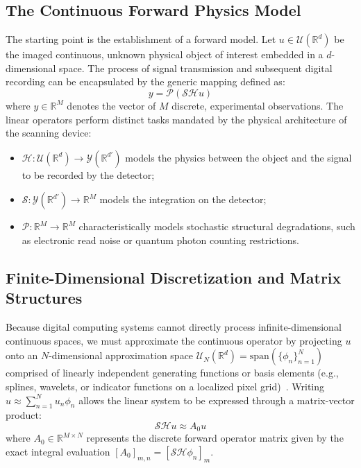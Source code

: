 \subsection{The Continuous Forward Physics Model}
The starting point is the establishment of a forward model. Let $u \in \mathcal{U}(\mathbb{R}^d)$ be the imaged continuous, unknown physical object of interest embedded in a $d$-dimensional space. The process of signal transmission and subsequent digital recording can be encapsulated by the generic mapping defined as:
\begin{equation}
    y = \mathcal{P}(\mathcal{S}\mathcal{H}u)
\end{equation}
where $y \in \mathbb{R}^M$ denotes the vector of $M$ discrete, experimental observations. The linear operators perform distinct tasks mandated by the physical architecture of the scanning device:
\begin{itemize}
    \item $\mathcal{H}: \mathcal{U}(\mathbb{R}^d) \to \mathcal{Y}(\mathbb{R}^{d'})$ models the physics between the object and the signal to be recorded by the detector;
    \item $\mathcal{S}: \mathcal{Y}(\mathbb{R}^{d'}) \to \mathbb{R}^M$ models the integration on the detector; 
    \item $\mathcal{P}: \mathbb{R}^M \to \mathbb{R}^M$ characteristically models stochastic structural degradations, such as electronic read noise or quantum photon counting restrictions.
\end{itemize}

\subsection{Finite-Dimensional Discretization and Matrix Structures}
Because digital computing systems cannot directly process infinite-dimensional continuous spaces, we must approximate the continuous operator by projecting $u$ onto an $N$-dimensional approximation space $\mathcal{U}_N(\mathbb{R}^d) = \text{span}(\{\phi_n\}_{n=1}^N)$ comprised of linearly independent generating functions or basis elements (e.g., splines, wavelets, or indicator functions on a localized pixel grid)~. Writing $u \approx \sum_{n=1}^N u_n \phi_n$ allows the linear system to be expressed through a matrix-vector product:
\begin{equation}
    \mathcal{S}\mathcal{H}u \approx A_0 u
\end{equation}
where $A_0 \in \mathbb{R}^{M \times N}$ represents the discrete forward operator matrix given by the exact integral evaluation $[A_0]_{m,n} = [\mathcal{S}\mathcal{H}\phi_n]_m$. 

